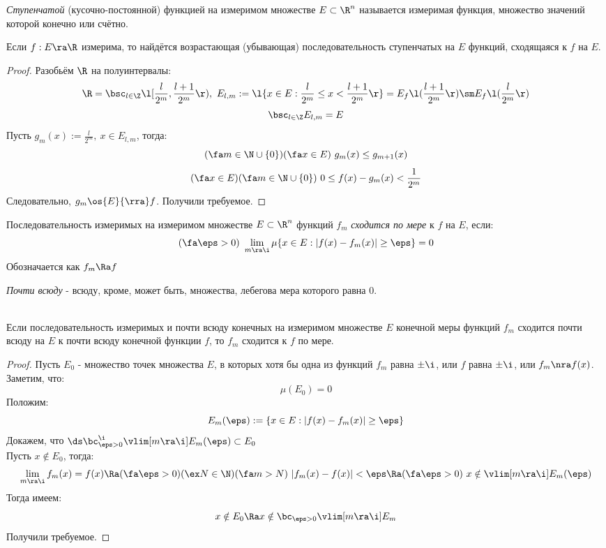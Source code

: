 \begin{definition}
	\textit{Ступенчатой} (кусочно-постоянной) функцией на измеримом множестве $E\subset\R^n$ называется измеримая функция, множество значений которой конечно или счётно.
\end{definition}
\begin{theorem}\label{24_th4}
	Если $f:E\ra\R$ измерима, то найдётся возрастающая (убывающая) последовательность ступенчатых на $E$ функций, сходящаяся к $f$ на $E$.
\end{theorem}
\begin{proof}
	Разобьём $\R$ на полуинтервалы:
	\[\R=\bsc_{l\in\Z}\l[\frac{l}{2^m},\frac{l+1}{2^m}\r),\ 
	E_{l,m}:=\l\{x\in E:\frac l{2^m}\le x<\frac{l+1}{2^m}\r\}=E_f\l(\frac{l+1}{2^m}\r)\sm E_f\l(\frac l{2^m}\r)\]
	\[\bsc_{l\in\Z}E_{l,m}=E\]
	Пусть $g_m(x):=\frac l{2^m},\ x\in E_{l,m}$, тогда:
	\[(\fa m\in\N\cup\{0\})(\fa x\in E)\ g_m(x)\le g_{m+1}(x)\]
	\[(\fa x\in E)(\fa m\in\N\cup\{0\})\ 0\le f(x)-g_m(x)<\frac1{2^m}\]
	Следовательно, $g_m\os{E}{\rra}f$. Получили требуемое.
\end{proof}
\begin{definition}
	Последовательность измеримых на измеримом множестве $E\subset\R^n$ функций $f_m$ \textit{сходится по мере} к $f$ на $E$, если:
	\[(\fa\eps>0)\ \lim_{m\ra\i}\mu\{x\in E:|f(x)-f_m(x)|\ge\eps\}=0\]
	Обозначается как $f_m\Ra f$
\end{definition}
\begin{definition}
	\textit{Почти всюду} - всюду, кроме, может быть, множества, лебегова мера которого равна 0.
\end{definition}
\begin{theorem}\label{24_th5}\\
	Если последовательность измеримых и почти всюду конечных на измеримом множестве $E$ конечной меры функций $f_m$ сходится почти всюду на $E$ к почти всюду конечной функции $f$, то $f_m$ сходится к $f$ по мере.
\end{theorem}
\begin{proof}
	Пусть $E_0$ - множество точек множества $E$, в которых хотя бы одна из функций $f_m$ равна $\pm\i$, или $f$ равна $\pm\i$, или $f_m\nra f(x)$.\\ Заметим, что:
	\[\mu(E_0)=0\]
	Положим:
	\[E_m(\eps):=\{x\in E:|f(x)-f_m(x)|\ge\eps\}\]
	Докажем, что $\ds\bc_{\eps>0}^\i\vlim[m\ra\i]E_m(\eps)\subset E_0$\\
	Пусть $x\notin E_0$, тогда:
	\[\lim_{m\ra\i}f_m(x)=f(x)\Ra(\fa\eps>0)(\ex N\in\N)(\fa m>N)\ |f_m(x)-f(x)|<\eps\Ra(\fa\eps>0)\ x\notin\vlim[m\ra\i]E_m(\eps)\]
	Тогда имеем:
	\[x\notin E_0\Ra x\notin\bc_{\eps>0}\vlim[m\ra\i]E_m\]
	Получили требуемое.
\end{proof}
